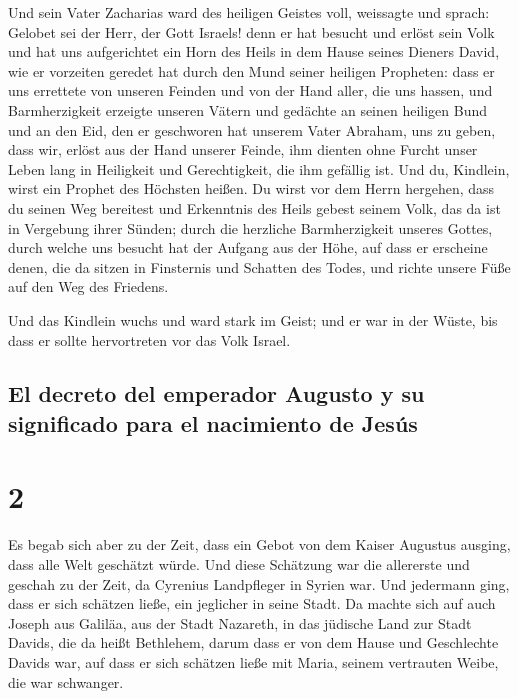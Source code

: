  Und sein Vater Zacharias ward des heiligen Geistes voll,
weissagte und sprach:  Gelobet sei der Herr, der Gott
Israels! denn er hat besucht und erlöst sein Volk  und
hat uns aufgerichtet ein Horn des Heils in dem Hause seines Dieners
David,  wie er vorzeiten geredet hat durch den Mund
seiner heiligen Propheten:  dass er uns errettete von
unseren Feinden und von der Hand aller, die uns hassen, 
und Barmherzigkeit erzeigte unseren Vätern und gedächte an seinen
heiligen Bund  und an den Eid, den er geschworen hat
unserem Vater Abraham, uns zu geben,  dass wir, erlöst
aus der Hand unserer Feinde, ihm dienten ohne Furcht unser Leben lang
 in Heiligkeit und Gerechtigkeit, die ihm gefällig ist.
 Und du, Kindlein, wirst ein Prophet des Höchsten heißen.
Du wirst vor dem Herrn hergehen, dass du seinen Weg bereitest
 und Erkenntnis des Heils gebest seinem Volk, das da ist
in Vergebung ihrer Sünden;  durch die herzliche
Barmherzigkeit unseres Gottes, durch welche uns besucht hat der Aufgang
aus der Höhe,  auf dass er erscheine denen, die da sitzen
in Finsternis und Schatten des Todes, und richte unsere Füße auf den Weg
des Friedens.

 Und das Kindlein wuchs und ward stark im Geist; und er
war in der Wüste, bis dass er sollte hervortreten vor das Volk Israel.

\hypertarget{el-decreto-del-emperador-augusto-y-su-significado-para-el-nacimiento-de-jesuxfas}{%
\subsection{El decreto del emperador Augusto y su significado para el
nacimiento de
Jesús}\label{el-decreto-del-emperador-augusto-y-su-significado-para-el-nacimiento-de-jesuxfas}}

\hypertarget{section-1}{%
\section{2}\label{section-1}}

 Es begab sich aber zu der Zeit, dass ein Gebot von dem
Kaiser Augustus ausging, dass alle Welt geschätzt würde. 
Und diese Schätzung war die allererste und geschah zu der Zeit, da
Cyrenius Landpfleger in Syrien war.  Und jedermann ging,
dass er sich schätzen ließe, ein jeglicher in seine Stadt.
 Da machte sich auf auch Joseph aus Galiläa, aus der Stadt
Nazareth, in das jüdische Land zur Stadt Davids, die da heißt Bethlehem,
darum dass er von dem Hause und Geschlechte Davids war, 
auf dass er sich schätzen ließe mit Maria, seinem vertrauten Weibe, die
war schwanger.

